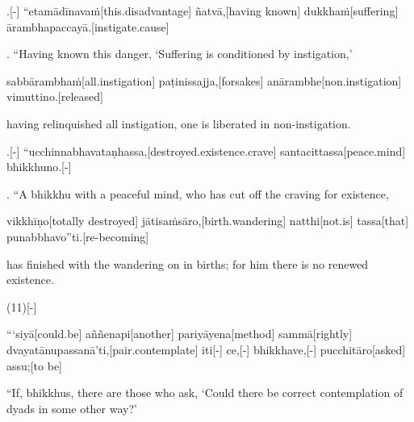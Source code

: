 \begin{samepage}
.[-] “etamādīnavaṁ[this.disadvantage] ñatvā,[having known] dukkhaṁ[suffering] ārambhapaccayā.[instigate.cause]
\endgl
\nopagebreak
\linespread{0.5}
\begin{spacin}{0.2}
{. “Having known this danger, ‘Suffering is conditioned by instigation,’}
\end{spacin}
\vskip 12pt
\end{samepage}
\begin{samepage}
\begingl[glneveryline={\PaliGlossA,\PaliGlossB}]
sabbārambhaṁ[all.instigation] paṭinissajja,[forsakes] anārambhe[non.instigation] vimuttino.[released]
\endgl
\nopagebreak
\linespread{0.5}
\begin{spacin}{0.2}
{\PaliGlossFT having relinquished all instigation, one is liberated in non-instigation.}
\end{spacin}
\vskip 12pt
\end{samepage}
\begin{samepage}
.[-] “ucchinnabhavataṇhassa,[destroyed.existence.crave] santacittassa[peace.mind] bhikkhuno.[-]
\endgl
\nopagebreak
\linespread{0.5}
\begin{spacin}{0.2}
{. “A bhikkhu with a peaceful mind, who has cut off the craving for existence,}
\end{spacin}
\vskip 12pt
\end{samepage}
\begin{samepage}
\begingl[glneveryline={\PaliGlossA,\PaliGlossB}]
vikkhīṇo[totally destroyed] jātisaṁsāro,[birth.wandering] natthi[not.is] tassa[that] punabbhavo”ti.[re-becoming]
\endgl
\nopagebreak
\linespread{0.5}
\begin{spacin}{0.2}
{\PaliGlossFT has finished with the wandering on in births; for him there is no renewed existence.}
\end{spacin}
\vskip 12pt
\end{samepage}
\vskip 0.2in
\begin{samepage}
\begingl[glneveryline={\PaliGlossA,\PaliGlossB}]
(11)[-]
\endgl
\nopagebreak
\linespread{0.5}
\begin{spacin}{0.2}
{\PaliGlossFT [11. Nutriment]}
\end{spacin}
\vskip 12pt
\end{samepage}
\begin{samepage}
\begingl[glneveryline={\PaliGlossA,\PaliGlossB}]
“‘siyā[could.be] aññenapi[another] pariyāyena[method] sammā[rightly] dvayatānupassanā’ti,[pair.contemplate] iti[-] ce,[-] bhikkhave,[-] pucchitāro[asked] assu;[to be]
\endgl
\nopagebreak
\linespread{0.5}
\begin{spacin}{0.2}
{\PaliGlossFT “If, bhikkhus, there are those who ask, ‘Could there be correct contemplation of dyads in some other way?’}
\end{spacin}
\vskip 12pt
\end{samepage}
